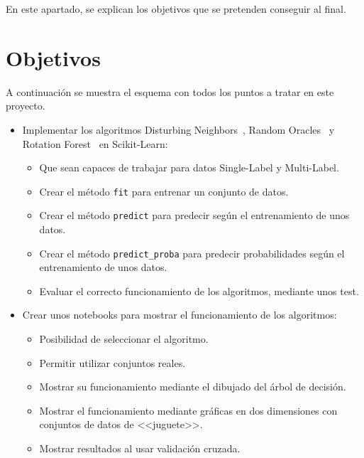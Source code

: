 
En este apartado,  se explican los objetivos que se pretenden conseguir al final.

\section{Objetivos}
A continuación se muestra el esquema con todos los puntos a tratar en este proyecto.
\begin{itemize}
\item Implementar los algoritmos Disturbing Neighbors~\cite{disturbingneighbors}, Random Oracles~\cite{randomoracles} y Rotation Forest~\cite{rotationforest} en Scikit-Learn:
	\begin{itemize}
		\item Que sean capaces de trabajar para datos Single-Label y Multi-Label.
		\item Crear el método \texttt{fit} para entrenar un conjunto de datos.
		\item Crear el método \texttt{predict} para predecir según el entrenamiento de unos datos.
		\item Crear el método \texttt{predict\_proba} para predecir probabilidades según el entrenamiento de unos datos.
		\item Evaluar el correcto funcionamiento de los algoritmos, mediante unos test.
	\end{itemize}
	
\item Crear unos notebooks para mostrar el funcionamiento de los algoritmos:
	\begin{itemize}
		\item Posibilidad de seleccionar el algoritmo.
		\item Permitir utilizar conjuntos reales.
		\item Mostrar su funcionamiento mediante el dibujado del árbol de decisión.
		\item Mostrar el funcionamiento mediante gráficas en dos dimensiones con conjuntos de datos de <<juguete>>.
		\item Mostrar resultados al usar validación cruzada.
	\end{itemize}
\end{itemize}
